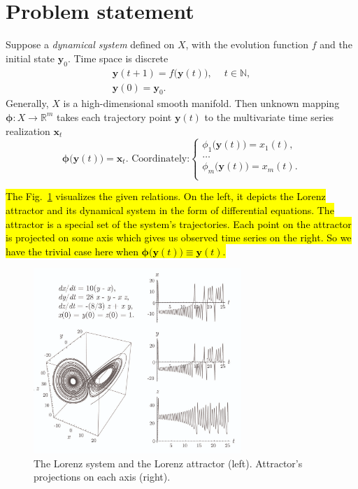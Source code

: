 \documentclass[referee, pdflatex, sn-mathphys-num]{sn-jnl}
\theoremstyle{definition}
\theoremstyle{plain}
\begin{document}
	\section{Problem statement}\label{sec:problem_statement}
	
	Suppose a \emph{dynamical system} defined on $ X $, with the evolution function $ f $ and the initial state $ \mathbf{y}_0 $. Time space is discrete \begin{gather*}
		\mathbf{y}(t + 1) = f \bigl( \mathbf{y}(t) \bigr), \quad \ t \in \mathbb{N}, \\
		\mathbf{y}(0) = \mathbf{y}_0 .
	\end{gather*} Generally, $ X $ is a high-dimensional smooth manifold. Then unknown mapping $ \boldsymbol{\phi}: X \to \mathbb{R}^m $ takes each trajectory point $ \mathbf{y}(t) $ to the multivariate time series realization $ \mathbf{x}_t $ \begin{equation*}
		\boldsymbol{\phi} \bigl( \mathbf{y}(t) \bigr) = \mathbf{x}_t. \text{ Coordinately:} \begin{cases}
			\phi_1 \bigl( \mathbf{y}(t) \bigr) = x_1(t), \\
			\ldots \\
			\phi_m \bigl( \mathbf{y}(t) \bigr) = x_m(t). \\
		\end{cases}
	\end{equation*}
	
	\hl{The Fig.~{\ref{pic:attractor}} visualizes the given relations. On the left, it depicts the Lorenz attractor and its dynamical system in the form of differential equations. The attractor is a special set of the system's trajectories. Each point on the attractor is projected on some axis which gives us observed time series on the right. So we have the trivial case here when $\boldsymbol{\phi} \bigl( \mathbf{y}(t) \bigr) \equiv \mathbf{y}(t)$.}
	
	\begin{figure}[!htbp]
		\centering
		\includegraphics[width=0.7\textwidth, keepaspectratio]{attractor_3d.png}
		\caption{The Lorenz system and the Lorenz attractor (left). Attractor's projections on each axis (right).}\label{pic:attractor}
	\end{figure}
	
\end{document}

